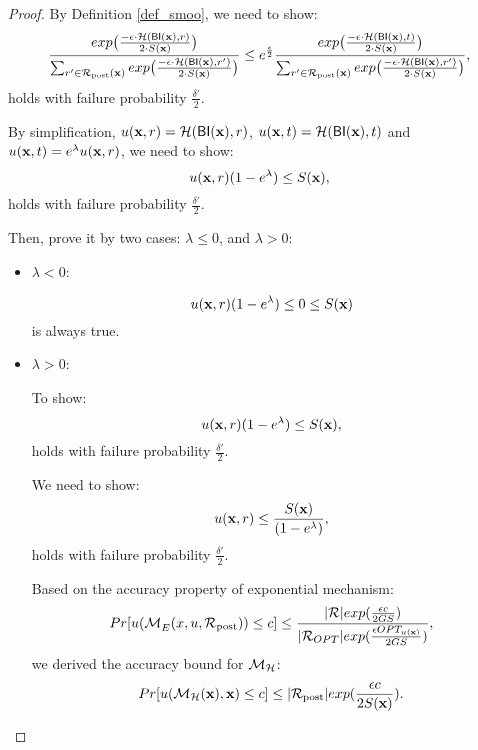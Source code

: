 \documentclass{article}
\begin{document}
\begin{proof}
        By Definition \ref{def_smoo}, we need to show:
        \begin{equation*}
        \frac {exp\big(\frac{-\epsilon\cdot\mathcal{H}(\mathsf{BI}(\textbf{x}),r)}{2\cdot S(\textbf{x})}\big)}{\sum_{r'\in \mathcal{R}_{\textup{post}}(\textbf{x})} exp \big(\frac{-\epsilon\cdot \mathcal{H} (\mathsf{BI}(\textbf{x}),r')}{2 \cdot S(\textbf{x})}\big)}
        \leq
        e^{\frac{\epsilon}{2}} \frac {exp\big(\frac{-\epsilon\cdot\mathcal{H}(\mathsf{BI}(\textbf{x}),t)}{2\cdot S(\textbf{x})}\big)}{\sum_{r'\in \mathcal{R}_{\textup{post}}(\textbf{x})} exp \big(\frac{-\epsilon\cdot \mathcal{H} (\mathsf{BI}(\textbf{x}),r')}{2 \cdot S(\textbf{x})}\big)},
        \end{equation*}
        holds with failure probability $\frac{\delta'}{2}$.

        By simplification, $u(\textbf{x}, {r}) = \mathcal{H}(\mathsf{BI}(\textbf{x}),r)$, $u(\textbf{x}, {t}) = \mathcal{H}(\mathsf{BI}(\textbf{x}),t)$ and $u(\textbf{x}, {t}) = e^{\lambda} u(\textbf{x}, {r})$, we need to show:
        \begin{equation*}
        u(\textbf{x}, {r})(1 - e ^ {\lambda})
        \leq 
        S(\textbf{x}),
        \end{equation*}
        holds with failure probability $\frac{\delta'}{2}$.

        Then, prove it by two cases: $\lambda \leq 0$, and $\lambda > 0$:

      \begin{itemize}
        \item {\boldmath$\lambda < 0$}:

          \begin{equation*}
          u(\textbf{x}, {r})(1 - e ^ {\lambda}) \leq 0 \leq S(\textbf{x})
          \end{equation*}
          is always true.

        \item {\boldmath $\lambda > 0$}:

          To show:
          \begin{equation*}
          u(\textbf{x}, {r})(1 - e ^ {\lambda})
          \leq 
          S(\textbf{x}),
          \end{equation*}
          holds with failure probability $\frac{\delta'}{2}$.

          We need to show:
          \begin{equation}
          \label{eq_dilation_case2}
          u(\textbf{x}, {r})
          \leq 
          \frac{S(\textbf{x})}{(1 - e ^ {\lambda})},
          \end{equation}         
          holds with failure probability $\frac{\delta'}{2}$.

          Based on the accuracy property of exponential mechanism:
          \begin{equation*}
          \begin{split}
          Pr[u(\mathcal{M}_E^{}({x},{u},{\mathcal{R}_{\textup{post}}})) \leq c] 
          & \leq \frac{|\mathcal{R}|exp(\frac{\epsilon c}{2 GS})}{|\mathcal{R}_{OPT}| exp(\frac{\epsilon OPT_{u(\textbf{x})}}{2 GS})},\\
          \end{split}
          \end{equation*}
          we derived the accuracy bound for $\mathcal{M}_{\mathcal{H}}$:
          \begin{equation*}
          Pr[u(\mathcal{M}_{\mathcal{H}}(\textbf{x}), \textbf{x}) \leq c] \leq |\mathcal{R}_{\textup{post}}|exp(\frac{\epsilon c}{2 S(\textbf{x})}).
          \end{equation*}


\end{itemize}
\end{proof}
\end{document}
